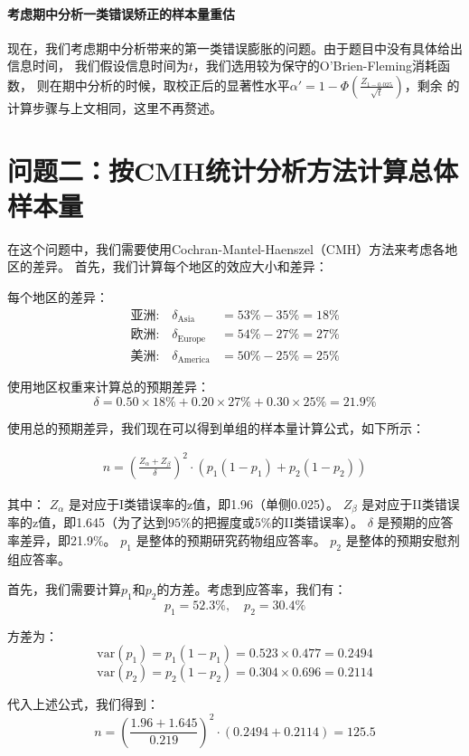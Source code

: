 \documentclass{article}
\begin{document}
\paragraph{考虑期中分析一类错误矫正的样本量重估}
现在，我们考虑期中分析带来的第一类错误膨胀的问题。由于题目中没有具体给出信息时间，
我们假设信息时间为$t$，我们选用较为保守的O'Brien-Fleming消耗函数，
则在期中分析的时候，取校正后的显著性水平$\alpha'= 1-\Phi(\frac{Z_{1-0.025}}{\sqrt{t}})$，剩余
的计算步骤与上文相同，这里不再赘述。





\section{问题二：按CMH统计分析方法计算总体样本量}
在这个问题中，我们需要使用Cochran-Mantel-Haenszel（CMH）方法来考虑各地区的差异。
首先，我们计算每个地区的效应大小和差异：

每个地区的差异：
\begin{align*}
\text{亚洲:} \quad \delta_{\text{Asia}} &= 53\% - 35\% = 18\% \\
\text{欧洲:} \quad \delta_{\text{Europe}} &= 54\% - 27\% = 27\% \\
\text{美洲:} \quad \delta_{\text{America}} &= 50\% - 25\% = 25\%
\end{align*}

使用地区权重来计算总的预期差异：
\[\delta = 0.50 \times 18\% + 0.20 \times 27\% + 0.30 \times 25\% = 21.9\%
\]

使用总的预期差异，我们现在可以得到单组的样本量计算公式，如下所示：

\begin{align*}
n = \left(\frac{Z_\alpha + Z_\beta}{\delta}\right)^2 \cdot \left(p_1(1-p_1) + p_2(1-p_2)\right)
\end{align*}

其中：
$Z_\alpha$ 是对应于I类错误率的z值，即1.96（单侧0.025）。
$Z_\beta$ 是对应于II类错误率的z值，即1.645（为了达到$95\%$的把握度或5$\%$的II类错误率）。
$\delta$ 是预期的应答率差异，即21.9$\%$。
$p_1$ 是整体的预期研究药物组应答率。
$p_2$ 是整体的预期安慰剂组应答率。

首先，我们需要计算$p_1$和$p_2$的方差。考虑到应答率，我们有：
\[
p_1 = 52.3\%, \quad p_2 = 30.4\%
\]

方差为：
\[
\text{var}(p_1) = p_1(1-p_1) = 0.523 \times 0.477 = 0.2494
\]
\[
\text{var}(p_2) = p_2(1-p_2) = 0.304 \times 0.696 = 0.2114
\]

代入上述公式，我们得到：
\[
n = \left(\frac{1.96 + 1.645}{0.219}\right)^2 \cdot (0.2494 + 0.2114) = 125.5
\]
\end{document}
